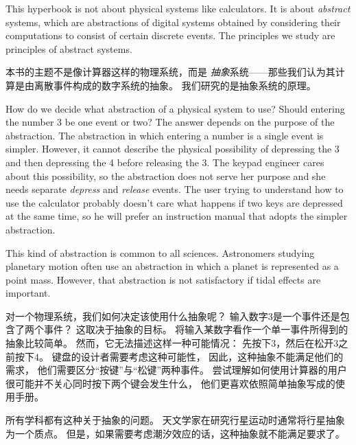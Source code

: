 \begin{en}
This hyperbook is not about physical systems like calculators.  It is
about 
\emph{abstract} systems, which are abstractions of digital systems
obtained by considering their computations to consist of certain
discrete events.  The principles we study are principles of abstract
systems.
\end{en}

\begin{ch}
  本书的主题不是像计算器这样的物理系统，而是%
  \emph{抽象}系统——那些我们认为其计算是由离散事件构成的数字系统的抽象。
  我们研究的是抽象系统的原理。
\end{ch}

\begin{en}
How do we decide what abstraction of a physical system to use?  Should
entering the number 3 be one event or two?  The answer depends on the
purpose of the abstraction.  The abstraction in which entering a
number is a single event is simpler.  However, it cannot describe the
physical possibility of depressing the 3 and then depressing the 4
before releasing the 3.  The keypad engineer cares about this
possibility, so the abstraction does not serve her purpose and she
needs separate \emph{depress} and \emph{release} events.  The user
trying to understand how to use the calculator probably doesn't care
what happens if two keys are depressed at the same time, so he will
prefer an instruction manual that adopts the simpler abstraction.

This kind of abstraction is common to all sciences.  Astronomers
studying planetary motion often use an abstraction in which a
planet is represented as a point mass.  However, that abstraction is not
satisfactory if tidal effects are important.  
\end{en}

\begin{ch}
  对一个物理系统，我们如何决定该使用什么抽象呢？
  输入数字$3$是一个事件还是包含了两个事件？
  这取决于抽象的目标。
  将输入某数字看作一个单一事件所得到的抽象比较简单。
  然而，它无法描述这样一种可能情况：
  先按下$3$，然后在松开$3$之前按下$4$。
  键盘的设计者需要考虑这种可能性，
  因此，这种抽象不能满足他们的需求，
  他们需要区分``按键''与``松键''两种事件。
  尝试理解如何使用计算器的用户很可能并不关心同时按下两个键会发生什么，
  他们更喜欢依照简单抽象写成的使用手册。

  所有学科都有这种关于抽象的问题。
  天文学家在研究行星运动时通常将行星抽象为一个质点。
  但是，如果需要考虑潮汐效应的话，这种抽象就不能满足要求了。
\end{ch}

